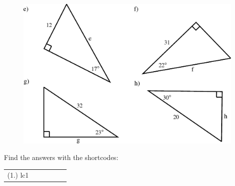     \setcounter{subfigure}{0}
	\begin{figure}[H] %
    \begin{center}
    \label{m39408*id816001!!!underscore!!!media}\label{m39408*id816001!!!underscore!!!printimage}\includegraphics{col11306.imgs/m39408_MG10C15_011.png} %
      \vspace{2pt}
    \vspace{.1in}
    \end{center}
 \end{figure}       
              \par 
    \label{m39408*eip-403}
\par {} Find the answers with the shortcodes:
 \par \begin{tabular}[h]{cccccc}
 (1.) lc1  & \end{tabular}
